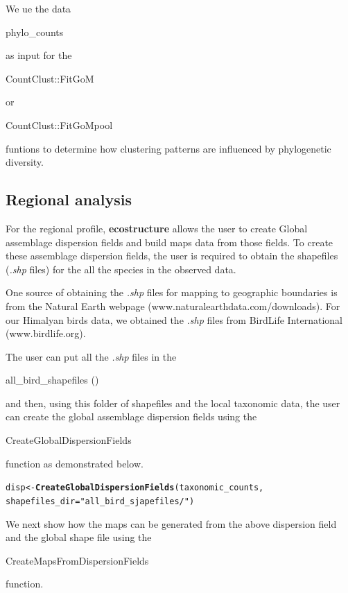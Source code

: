 \documentclass[12pt]{article}\usepackage[]{graphicx}\usepackage[usenames,dvipsnames]{color}
\makeatletter
\newcommand{\hlstr}[1]{\textcolor[rgb]{0.192,0.494,0.8}{#1}}%
\newcommand{\hlstd}[1]{\textcolor[rgb]{0.345,0.345,0.345}{#1}}%
\newcommand{\hlkwb}[1]{\textcolor[rgb]{0.69,0.353,0.396}{#1}}%
\newcommand{\hlkwc}[1]{\textcolor[rgb]{0.333,0.667,0.333}{#1}}%
\newcommand{\hlkwd}[1]{\textcolor[rgb]{0.737,0.353,0.396}{\textbf{#1}}}%
\newenvironment{kframe}{%
 \def\at@end@of@kframe{}%
 \ifinner\ifhmode%
  \def\at@end@of@kframe{\end{minipage}}%
  \begin{minipage}{\columnwidth}%
 \fi\fi%
 \def\FrameCommand##1{\hskip\@totalleftmargin \hskip-\fboxsep
 \colorbox{shadecolor}{##1}\hskip-\fboxsep
     \hskip-\linewidth \hskip-\@totalleftmargin \hskip\columnwidth}%
 \MakeFramed {\advance\hsize-\width
   \@totalleftmargin\z@ \linewidth\hsize
   \@setminipage}}%
 {\par\unskip\endMakeFramed%
 \at@end@of@kframe}
\newenvironment{knitrout}{}{} %
\makeatother
\begin{document}
We ue the data \begin{verb} phylo_counts \end{verb} as input for the \begin{verb} CountClust::FitGoM \end{verb} or  \begin{verb} CountClust::FitGoMpool \end{verb}  funtions to determine how clustering patterns are influenced by phylogenetic diversity.

\subsection{Regional analysis}

For the regional profile, \textbf{ecostructure} allows the user to create Global assemblage dispersion fields and build maps data from those fields. To create these assemblage dispersion fields, the user is required to obtain the shapefiles (\textit{.shp} files) for the all the species in the observed data.

One source of obtaining the \textit{.shp} files for mapping to geographic boundaries is from the Natural Earth webpage (www.naturalearthdata.com/downloads). For our Himalyan birds data, we obtained the \textit{.shp} files from BirdLife International (www.birdlife.org).

The user can put all the \textit{.shp} files in the \begin{verb} all_bird_shapefiles () \end{verb} and then, using this folder of shapefiles and the local taxonomic data, the user can create the global assemblage dispersion fields using the \begin{verb} CreateGlobalDispersionFields \end{verb} function as demonstrated below.

\begin{knitrout}
\color{fgcolor}\begin{kframe}
\begin{alltt}
\hlstd{disp} \hlkwb{<-} \hlkwd{CreateGlobalDispersionFields}\hlstd{(taxonomic_counts,}
              \hlkwc{shapefiles_dir} \hlstd{=} \hlstr{"all_bird_sjapefiles/"}\hlstd{)}
\end{alltt}
\end{kframe}
\end{knitrout}

We next show how the maps can be generated from the above dispersion field and the global shape file using the \begin{verb} CreateMapsFromDispersionFields \end{verb} function.
\end{document}
